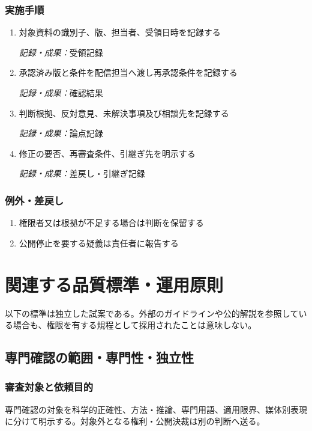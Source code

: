 \documentclass[a4paper,11pt]{article}
\begin{document}
\subsubsection*{実施手順}
\begin{enumerate}[leftmargin=2em,itemsep=0.65em]
\item 対象資料の識別子、版、担当者、受領日時を記録する\par\noindent\textit{記録・成果：}受領記録\nobreak\smallskip
\item 承認済み版と条件を配信担当へ渡し再承認条件を記録する\par\noindent\textit{記録・成果：}確認結果\nobreak\smallskip
\item 判断根拠、反対意見、未解決事項及び相談先を記録する\par\noindent\textit{記録・成果：}論点記録\nobreak\smallskip
\item 修正の要否、再審査条件、引継ぎ先を明示する\par\noindent\textit{記録・成果：}差戻し・引継ぎ記録\nobreak\smallskip
\end{enumerate}
\subsubsection*{例外・差戻し}
\begin{enumerate}[leftmargin=2em,itemsep=0.35em]
\item 権限者又は根拠が不足する場合は判断を保留する
\item 公開停止を要する疑義は責任者に報告する
\end{enumerate}
\section{関連する品質標準・運用原則}
\par 以下の標準は独立した試案である。外部のガイドラインや公的解説を参照している場合も、権限を有する規程として採用されたことは意味しない。\par\medskip
\subsection{専門確認の範囲・専門性・独立性}
\subsubsection{審査対象と依頼目的}
\par 専門確認の対象を科学的正確性、方法・推論、専門用語、適用限界、媒体別表現に分けて明示する。対象外となる権利・公開決裁は別の判断へ送る。\par\medskip
\end{document}
